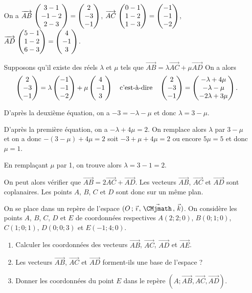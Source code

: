 \documentclass[11pt,fleqn, openany]{book} %
\begin{document}
\begin{solution}On a $\coorde{AB}{3-1}{-1-2}{2-3}=\coordbe{2}{-3}{-1}$, $\coorde{AC}{0-1}{1-2}{1-3}=\coordbe{-1}{-1}{-2}$, $\coorde{AD}{5-1}{1-2}{6-3}=\coordbe{4}{-1}{3}$.

Supposons qu'il existe des réels $\lambda$ et $\mu$ tels que $\overrightarrow{AB}=\lambda \overrightarrow{AC}+\mu \overrightarrow{AD}$ On a alors
\[ \coordbe{2}{-3}{-1}=\lambda\coordbe{-1}{-1}{-2}+\mu \coordbe{4}{-1}{3} \quad \text{c'est-à-dire}\quad \coordbe{2}{-3}{-1} = \coordbe{-\lambda+4\mu}{-\lambda-\mu}{-2\lambda+3\mu}.\]

D'après la deuxième équation, on a $-3=-\lambda-\mu$ et donc $\lambda = 3-\mu$.

D'après la première équation, on a $-\lambda +4\mu = 2$. On remplace alors $\lambda$ par $3-\mu$ et on a donc $-(3-\mu)+4\mu=2$ soit $-3+\mu+4\mu=2$ ou encore $5\mu = 5$ et donc $\mu=1$.

En remplaçant $\mu$ par 1, on trouve alors $\lambda = 3-1=2$.

On peut alors vérifier que $\overrightarrow{AB}=2\overrightarrow{AC}+\overrightarrow{AD}$. Les vecteurs $\overrightarrow{AB}$, $\overrightarrow{AC}$ et $\overrightarrow{AD}$ sont coplanaires. Les points $A$, $B$, $C$ et $D$ sont donc sur un même plan.\end{solution}





\begin{exercise}On se place dans un repère de l'espace $\Oijk$. On considère les points $A$, $B$, $C$, $D$ et $E$ de coordonnées respectives $A(2;2;0)$, $B(0;1;0)$, $C(1;0;1)$, $D(0;0;3)$ et $E(-1;4;0)$.
\begin{enumerate}
\item Calculer les coordonnées des vecteurs $\overrightarrow{AB}$, $\overrightarrow{AC}$, $\overrightarrow{AD}$ et $\overrightarrow{AE}$.
\item Les vecteurs $\overrightarrow{AB}$, $\overrightarrow{AC}$ et $\overrightarrow{AD}$ forment-ils une base de l'espace ?
\item Donner les coordonnées du point $E$ dans le repère $(A;\overrightarrow{AB},\overrightarrow{AC},\overrightarrow{AD})$.
\end{enumerate}\end{exercise}
\end{document}
